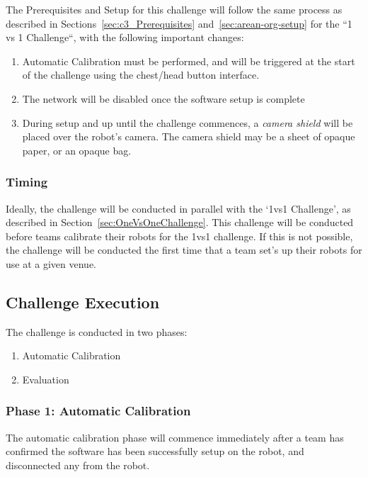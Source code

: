 The Prerequisites and Setup for this challenge will follow the same process as described in Sections~\ref{sec:c3_Prerequisites} and~\ref{sec:arean-org-setup} for the ``1 vs 1 Challenge``, with the following important changes:
\begin{enumerate}
    \item Automatic Calibration must be performed, and will be triggered at the start of the challenge using the chest/head button interface. 
    \item The network will be disabled once the software setup is complete
    \item During setup and up until the challenge commences, a \textit{camera shield} will be placed over the robot's camera. The camera shield may be a sheet of opaque paper, or an opaque bag.
\end{enumerate}

\subsubsection{Timing}
Ideally, the challenge will be conducted in parallel with the `1vs1 Challenge', as described in Section~\ref{sec:OneVsOneChallenge}.
This challenge will be conducted before teams calibrate their robots for the 1vs1 challenge. If this is not possible, the challenge will be conducted the first time that a team set's up their robots for use at a given venue.

\subsection{Challenge Execution}

The challenge is conducted in two phases:
\begin{enumerate}
    \item Automatic Calibration
    \item Evaluation
\end{enumerate}

\subsubsection{Phase 1: Automatic Calibration}

The automatic calibration phase will commence immediately after a team has confirmed the software has been successfully setup on the robot, and disconnected any from the robot.

